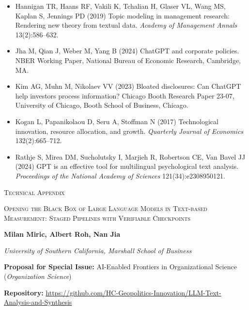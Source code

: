 \documentclass[11pt]{article}
\begin{document}
\begin{itemize}
    \item Hannigan TR, Haans RF, Vakili K, Tchalian H, Glaser VL, Wang MS, Kaplan S, Jennings PD (2019) Topic modeling in management research: Rendering new theory from textual data. \textit{Academy of Management Annals} 13(2):586--632.
    \item Jha M, Qian J, Weber M, Yang B (2024) ChatGPT and corporate policies. NBER Working Paper, National Bureau of Economic Research, Cambridge, MA.
    \item Kim AG, Muhn M, Nikolaev VV (2023) Bloated disclosures: Can ChatGPT help investors process information? Chicago Booth Research Paper 23-07, University of Chicago, Booth School of Business, Chicago.
    \item Kogan L, Papanikolaou D, Seru A, Stoffman N (2017) Technological innovation, resource allocation, and growth. \textit{Quarterly Journal of Economics} 132(2):665--712.
    \item Rathje S, Mirea DM, Sucholutsky I, Marjieh R, Robertson CE, Van Bavel JJ (2024) GPT is an effective tool for multilingual psychological text analysis. \textit{Proceedings of the National Academy of Sciences} 121(34):e2308950121.
\end{itemize}


\clearpage
\appendix

\begin{center}
    {\huge \textsc{Technical Appendix}\par}
    \vspace{1.2em}
    {\Large \textsc{Opening the Black Box of Large Language Models in Text-based Measurement: Staged Pipelines with Verifiable Checkpoints}\par}
    \vspace{1em}
    {\normalsize\bfseries Milan Miric, Albert Roh, Nan Jia\par}
    \vspace{0.2em}
    {\small\itshape University of Southern California, Marshall School of Business\par}
    \vspace{0.8em}
    {\footnotesize\textbf{Proposal for Special Issue:} AI-Enabled Frontiers in Organizational Science (\textit{Organization Science})\par}
    \vspace{0.3em}
    {\footnotesize\textbf{Repository:} \url{https://github.com/HC-Geopolitics-Innovation/LLM-Text-Analysis-and-Synthesis}\par}
\end{center}
\end{document}
